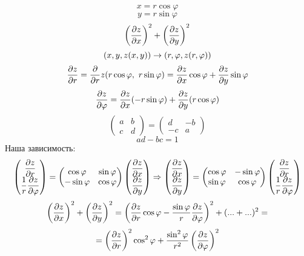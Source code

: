 \documentclass[main]{subfiles}
\begin{document}
\begin{enumerate}
    \begin{Example}
      \[x = r \cos \varphi\]
      \[y = r \sin \varphi\]
      \[\left(\dfrac{\partial z}{\partial x}\right)^2 + \left(\dfrac{\partial z}{\partial y}\right)^2\]
      \[(x,y,z(x,y)) \rightarrow (r,\varphi, z(r,\varphi))\]
      \[\dfrac{\partial z}{\partial r} = \dfrac{\partial }{\partial r} z (r \cos \varphi,\ r \sin\varphi) = \dfrac{\partial z}{\partial x} \cos \varphi + \dfrac{\partial z}{\partial y} \sin \varphi\]
      \[\dfrac{\partial z}{\partial \varphi} = \dfrac{\partial z}{\partial x} (-r \sin \varphi) + \dfrac{\partial z}{\partial y}(r \cos \varphi)\]
      \[\begin{pmatrix}
        a & b\\
        c & d
      \end{pmatrix} = \begin{pmatrix}
        d & -b\\
        -c & a
      \end{pmatrix}\]
      \[ad - bc = 1\]
      Наша зависимость:
      \[\begin{pmatrix}
        \dfrac{\partial z}{\partial r}\\
        \dfrac{1}{r} \dfrac{\partial z}{\partial \varphi}
      \end{pmatrix} = \begin{pmatrix}
        \cos \varphi & \sin \varphi\\
        -\sin \varphi & \cos \varphi
      \end{pmatrix} \begin{pmatrix}
        \dfrac{\partial z}{\partial x}\\
        \dfrac{\partial z}{\partial y}
      \end{pmatrix} \Rightarrow \begin{pmatrix}
        \dfrac{\partial z}{\partial x}\\
        \dfrac{\partial z}{\partial y}
      \end{pmatrix} = \begin{pmatrix}
      \cos \varphi & -\sin \varphi\\
      \sin \varphi & \cos \varphi
    \end{pmatrix} \begin{pmatrix}
    \dfrac{\partial z}{\partial r}\\
    \dfrac{1}{r} \dfrac{\partial z}{\partial \varphi}
    \end{pmatrix}\]
    \[\left(\dfrac{\partial z}{\partial x}\right)^2 + \left(\dfrac{\partial z}{\partial y}\right)^2 = \left(\dfrac{\partial z}{\partial r} \cos \varphi - \dfrac{\sin \varphi}{r} \dfrac{\partial z}{\partial \varphi}\right)^2 + (...+...)^2 = \]
    \[= \left(\dfrac{\partial z}{\partial r}\right)^2 \cos^2 \varphi + \dfrac{\sin^2 \varphi}{r^2} \left(\dfrac{\partial z}{\partial \varphi}\right)^2\]
    \end{Example}


\end{enumerate}
\end{document}
